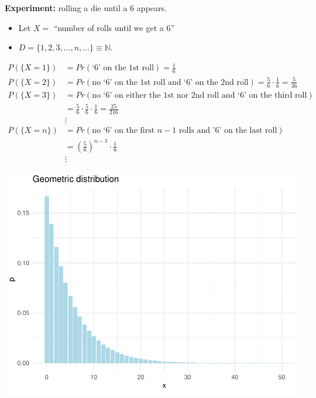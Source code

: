 \documentclass[smaller, handout]{beamer}\usepackage[]{graphicx}\usepackage[]{color}
\newenvironment{knitrout}{}{} %
\begin{document}
\begin{frame}{\secname}
  \begin{example}
  \begin{footnotesize}
  \textbf{Experiment:} rolling a die until a 6 appears.
  \begin{itemize}
  \item Let $X=$ ``number of rolls until we get a 6''
  \item $D = \{1, 2, 3,\ldots,n, \ldots \} \equiv \mathbb{N}$.
  \end{itemize}
  \begin{align*}
  P(\{X=1\}) &=Pr(\text{`6' on the 1st roll})= \frac{1}{6}\\
  P(\{X=2\})&=Pr \left( \text{no `6' on the 1st roll and `6' on the 2nd roll}\right) =\frac{5}{6}\cdot \frac{1}{6}=\frac{5}{36}\\
  P(\{X=3\})&=Pr \left( \text{no `6' on either the 1st nor 2nd roll and `6' on the third roll}\right)\\
  &=\frac{5}{6}\cdot \frac{5}{6}\cdot \frac{1}{6}=\frac{25}{216}\\
  &\vdots \\
  P(\{X=n\})&=Pr( \text{no `}6\text{' on the first }n-1\text{ rolls and '6' on the last roll})\\
  &=\left(\frac{5}{6}\right)^{n-1}\cdot \frac{1}{6} \\
  &\vdots
  \end{align*}
  \end{footnotesize}
  \end{example}
\end{frame}

\begin{frame}{\secname}
\begin{example}[continued]



\begin{knitrout}
\color{fgcolor}

\hfill{}\includegraphics[width=0.5\linewidth]{figure/unnamed-chunk-2-1} 



\end{knitrout}
\end{example}
\end{frame}
\end{document}
